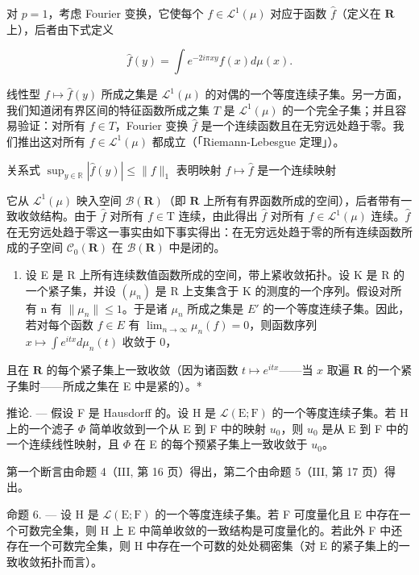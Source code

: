 对 \(p = 1\)，考虑 Fourier 变换，它使每个 \(f \in \mathcal{L}^1(\mu)\) 对应于函数 \(\hat{f}\)（定义在 \(\mathbf{R}\) 上），后者由下式定义

\[
\hat {f} (y) = \int e ^ {- 2 i \pi x y} f (x) d \mu (x).
\]

线性型 \(f \mapsto \hat{f}(y)\) 所成之集是 \(\mathcal{L}^1(\mu)\) 的对偶的一个等度连续子集。另一方面，我们知道闭有界区间的特征函数所成之集 \(T\) 是 \(\mathcal{L}^1(\mu)\) 的一个完全子集；并且容易验证：对所有 \(f \in T\)，Fourier 变换 \(\hat{f}\) 是一个连续函数且在无穷远处趋于零。我们推出这对所有 \(f \in \mathcal{L}^1(\mu)\) 都成立（「Riemann-Lebesgue 定理」）。

关系式 \(\sup_{y\in \mathbb{R}}|\hat{f} (y)|\leqslant \| f\| _1\) 表明映射 \(f\mapsto \hat{f}\) 是一个连续映射

它从 \(\mathcal{L}^1 (\mu)\) 映入空间 \(\mathcal{B}(\mathbf{R})\)（即 \(\mathbf{R}\) 上所有有界函数所成的空间），后者带有一致收敛结构。由于 \(\hat{f}\) 对所有 \(f\in \mathrm{T}\) 连续，由此得出 \(\hat{f}\) 对所有 \(f\in \mathcal{L}^1 (\mu)\) 连续。\(\hat{f}\) 在无穷远处趋于零这一事实由如下事实得出：在无穷远处趋于零的所有连续函数所成的子空间 \(\mathcal{C}_0(\mathbf{R})\) 在 \(\mathcal{B}(\mathbf{R})\) 中是闭的。

\begin{enumerate}
\def\labelenumi{\arabic{enumi})}
\setcounter{enumi}{1}
\tightlist
\item
  设 E 是 R 上所有连续数值函数所成的空间，带上紧收敛拓扑。设 K 是 R 的一个紧子集，并设 \((\mu_{n})\) 是 R 上支集含于 K 的测度的一个序列。假设对所有 n 有 \(\|\mu_{n}\|\leqslant1\)。于是诸 \(\mu_{n}\) 所成之集是 \(E'\) 的一个等度连续子集。因此，若对每个函数 \(f\in E\) 有 \(\lim_{n\to\infty}\mu_{n}(f)=0\)，则函数序列 \(x\mapsto\int e^{itx}d\mu_{n}(t)\) 收敛于 0，
\end{enumerate}

且在 \(\mathbf{R}\) 的每个紧子集上一致收敛（因为诸函数 \(t \mapsto e^{itx}\)——当 \(x\) 取遍 \(\mathbf{R}\) 的一个紧子集时——所成之集在 E 中是紧的）。*

推论. --- 假设 F 是 Hausdorff 的。设 H 是 \(\mathcal{L}(\mathrm{E};\mathrm{F})\) 的一个等度连续子集。若 H 上的一个滤子 \(\Phi\) 简单收敛到一个从 E 到 F 中的映射 \(u_{0}\)，则 \(u_{0}\) 是从 E 到 F 中的一个连续线性映射，且 \(\Phi\) 在 E 的每个预紧子集上一致收敛于 \(u_{0}\)。

第一个断言由命题 4（III, 第 16 页）得出，第二个由命题 5（III, 第 17 页）得出。

命题 6. --- 设 H 是 \(\mathcal{L}(\mathrm{E};\mathrm{F})\) 的一个等度连续子集。若 F 可度量化且 E 中存在一个可数完全集，则 H 上 E 中简单收敛的一致结构是可度量化的。若此外 F 中还存在一个可数完全集，则 H 中存在一个可数的处处稠密集（对 E 的紧子集上的一致收敛拓扑而言）。

